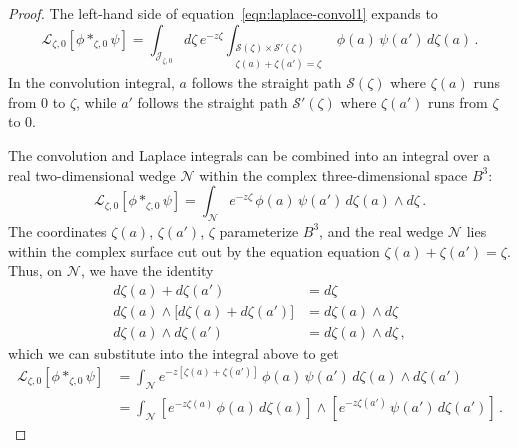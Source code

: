 \documentclass{article}
\newcommand{\laplace}{\mathcal{L}}
\theoremstyle{definition}
\theoremstyle{plain}
\newenvironment{revised}{\color{DarkBlue}}{\color{black}}
\newenvironment{revised}{}{}
\begin{document}
\begin{proof}
\begin{revised}
The left-hand side of equation~\eqref{eqn:laplace-convol1} expands to
\[ \laplace_{\zeta,0}[{\phi}\ast_{\zeta, 0}{\psi}] = \int_{\mathcal{J}_{\zeta, 0}} d\zeta\,e^{-z\zeta}\int_{\substack{\mathcal{S}(\zeta) \times \mathcal{S}'(\zeta) \\ \zeta(a) + \zeta(a') = \zeta}}  \phi(a)\,\psi(a')\, d\zeta(a)\,. \]
In the convolution integral, $a$ follows the straight path $\mathcal{S}(\zeta)$ where $\zeta(a)$ runs from $0$ to $\zeta$, while $a'$ follows the straight path $\mathcal{S}'(\zeta)$ where $\zeta(a')$ runs from $\zeta$ to $0$.

The convolution and Laplace integrals can be combined into an integral over a real two-dimensional wedge $\mathcal{N}$ within the complex three-dimensional space $B^3$:
\[ \laplace_{\zeta,0}[{\phi}\ast_{\zeta, 0}{\psi}] = \int_\mathcal{N} e^{-z\zeta}\,\phi(a)\, \psi(a')\,d\zeta(a) \wedge d\zeta\,. \]
The coordinates $\zeta(a)$, $\zeta(a')$, $\zeta$ parameterize $B^3$, and the real wedge $\mathcal{N}$ lies within the complex surface cut out by the equation equation $\zeta(a) + \zeta(a') = \zeta$. Thus, on $\mathcal{N}$, we have the identity
\begin{align*}
d\zeta(a) + d\zeta(a') & = d\zeta \\
d\zeta(a) \wedge \big[d\zeta(a) + d\zeta(a')\big] & = d\zeta(a) \wedge d\zeta\\
d\zeta(a) \wedge d\zeta(a') & = d\zeta(a) \wedge d\zeta\,,
\end{align*}
which we can substitute into the integral above to get
\begin{align*}
\laplace_{\zeta,0}[{\phi}\ast_{\zeta,0}{\psi}] & = \int_\mathcal{N} e^{-z[\zeta(a) + \zeta(a')]}\,\phi(a)\, \psi(a')\,d\zeta(a) \wedge d\zeta(a') \\
& = \int_\mathcal{N} \left[ e^{-z\zeta(a)}\,\phi(a)\,d\zeta(a) \right] \wedge \left[ e^{-z\zeta(a')}\,\psi(a')\,d\zeta(a') \right]\,.
\end{align*}


\end{revised}
\end{proof}
\end{document}
